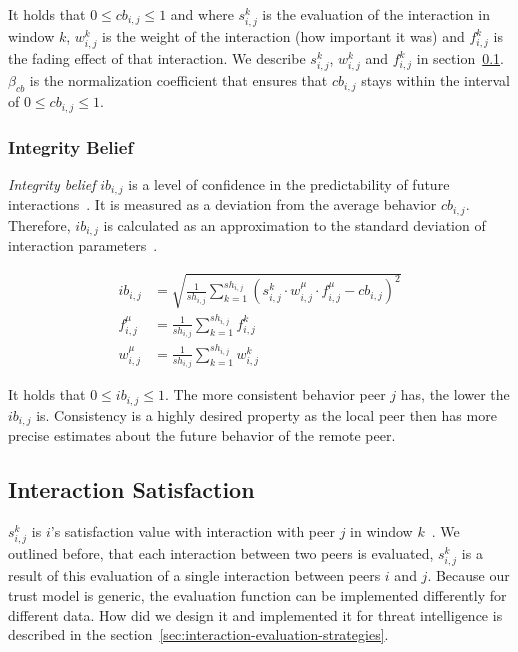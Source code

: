 It holds that $0 \leq cb_{i,j} \leq 1$ and where $s^{k}_{i,j}$ is the evaluation of the interaction in window $k$, $w^{k}_{i, j}$ is the weight of the interaction (how important it was) and $f^{k}_{i,j}$ is the fading effect of that interaction. We describe $s^{k}_{i,j}$, $w^{k}_{i,j}$ and $f^{k}_{i,j}$ in section~\ref{subsec:interaction-satisfaction}. 
$\beta_{cb}$ is the normalization coefficient that ensures that $cb_{i, j}$ stays within the interval of $0 \leq cb_{i,j} \leq 1$.

\subsubsection{Integrity Belief}
\textit{Integrity belief} $ib_{i,j}$ is a level of confidence in the predictability of future interactions~\cite{sort}. It is measured as a deviation from the average behavior $cb_{i,j}$.
Therefore, $ib_{i,j}$ is calculated as an approximation to the standard deviation of interaction parameters~\cite{sort}.

\begin{equation}
\begin{split}
    ib_{i,j} &= \sqrt{\frac{1}{sh_{i,j}} \sum_{k=1}^{sh_{i,j}}\left(s_{i,j}^{k} \cdot w_{i,j}^{\mu} \cdot f_{i,j}^{\mu} - cb_{i,j}\right)^{2}} \\
    f_{i,j}^{\mu} &= \frac{1}{sh_{i, j}} \sum_{k=1}^{sh_{i,j}} f^{k}_{i,j} \\
    w_{i,j}^{\mu} &= \frac{1}{sh_{i, j}} \sum_{k=1}^{sh_{i,j}} w^{k}_{i,j}
\end{split}
\end{equation}

It holds that $0 \leq ib_{i,j} \leq 1$.
The more consistent behavior peer $j$ has, the lower the $ib_{i,j}$ is. Consistency is a highly desired property as the local peer then has more precise estimates about the future behavior of the remote peer.

\subsection{Interaction Satisfaction}
\label{subsec:interaction-satisfaction}
$s^{k}_{i, j}$ is $i$'s satisfaction value with interaction with peer $j$ in window $k$~\cite{sort}.
We outlined before, that each interaction between two peers is evaluated, $s^{k}_{i, j}$ is a result of this evaluation of a single interaction between peers $i$ and $j$.
Because our trust model is generic, the evaluation function can be implemented differently for different data.
How did we design it and implemented it for threat intelligence is described in the section~\ref{sec:interaction-evaluation-strategies}.

